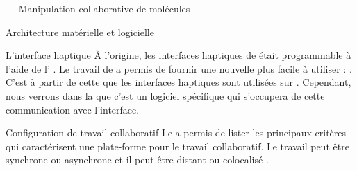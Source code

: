 \documentclass[myfrancais]{mythesis}
\begin{document}
\begin{mychapter}{\myShaddock\ -- Manipulation collaborative de molécules}
\begin{mysection}{Architecture matérielle et logicielle}
\begin{mysubsection}{L'interface haptique}
				À l'origine, les interfaces haptiques de \mySensAble était programmable à l'aide de l' \myGhost {}.
				Le travail de  a permis de fournir une nouvelle  plus facile à utiliser : \myOpenHaptics.
				C'est à partir de cette  que les interfaces haptiques sont utilisées sur \myShaddock.
				Cependant, nous verrons dans la  que c'est un logiciel spécifique qui s'occupera de cette communication avec l'interface.
			\end{mysubsection}
			\begin{mysubsection}{Configuration de travail collaboratif}
				Le  a permis de lister les principaux critères qui caractérisent une plate-forme pour le travail collaboratif.
				Le travail peut être synchrone ou asynchrone et il peut être distant ou colocalisé .


\end{mysubsection}
\end{mysection}
\end{mychapter}
\end{document}
